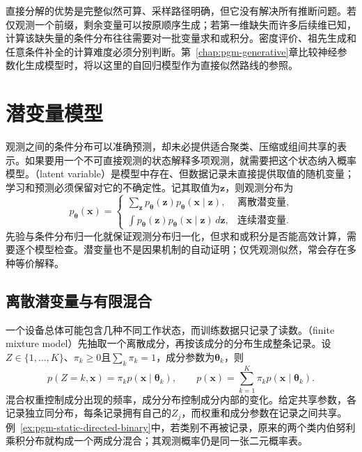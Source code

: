 直接分解的优势是完整似然可算、采样路径明确，但它没有解决所有推断问题。若仅观测一个前缀，剩余变量可以按原顺序生成；若第一维缺失而许多后续维已知，计算该缺失量的条件分布往往需要对一批变量求和或积分。密度评价、祖先生成和任意条件补全的计算难度必须分别判断。第~\ref{chap:pgm-generative}章比较神经参数化生成模型时，将以这里的自回归模型作为直接似然路线的参照。

\section{潜变量模型}
\label{sec:pgm-static-directed-latent}

观测之间的条件分布可以准确预测，却未必提供适合聚类、压缩或组间共享的表示。如果要用一个不可直接观测的状态解释多项观测，就需要把这个状态纳入概率模型。（latent variable）是模型中存在、但数据记录未直接提供取值的随机变量；学习和预测必须保留对它的不确定性。记其取值为$\bm{z}$，则观测分布为
\begin{equation}
  \label{eq:pgm-static-directed-marginal}
  p_{\bm{\theta}}(\bm{x})=
  \begin{cases}
    \sum_{\bm{z}}p_{\bm{\theta}}(\bm{z})
          p_{\bm{\theta}}(\bm{x}\mid\bm{z}),
          &\text{离散潜变量},\\
    \int p_{\bm{\theta}}(\bm{z})
          p_{\bm{\theta}}(\bm{x}\mid\bm{z})\,d\bm{z},
          &\text{连续潜变量}.
  \end{cases}
\end{equation}
先验与条件分布归一化就保证观测分布归一化，但求和或积分是否能高效计算，需要逐个模型检查。潜变量也不是因果机制的自动证明；仅凭观测似然，常会存在多种等价解释。

\subsection{离散潜变量与有限混合}
\label{sec:pgm-static-directed-mixtures}

一个设备总体可能包含几种不同工作状态，而训练数据只记录了读数。（finite mixture model）先抽取一个离散成分，再按该成分的分布生成整条记录。设$Z\in\{1,\ldots,K\}$、$\pi_k\ge0$且$\sum_k\pi_k=1$，成分参数为$\bm{\theta}_k$，则
\begin{equation}
  \label{eq:pgm-static-directed-mixture}
  p(Z=k,\bm{x})=\pi_k p(\bm{x}\mid\bm{\theta}_k),
  \qquad
  p(\bm{x})=\sum_{k=1}^{K}\pi_kp(\bm{x}\mid\bm{\theta}_k).
\end{equation}
混合权重控制成分出现的频率，成分分布控制成分内部的变化。给定共享参数，各记录独立同分布，每条记录拥有自己的$Z_j$，而权重和成分参数在记录之间共享。例~\ref{ex:pgm-static-directed-binary}中，若类别不再被记录，原来的两个类内伯努利乘积分布就构成一个两成分混合；其观测概率仍是同一张二元概率表。


